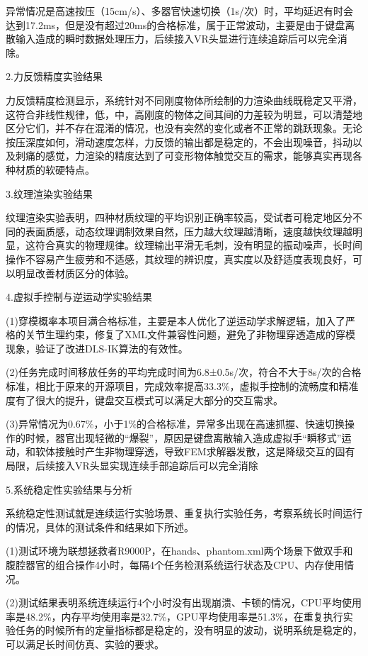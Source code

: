 异常情况是高速按压（15cm/s）、多器官快速切换（1s/次）时，平均延迟有时会达到17.2ms，但是没有超过20ms的合格标准，属于正常波动，主要是由于键盘离散输入造成的瞬时数据处理压力，后续接入VR头显进行连续追踪后可以完全消除。

2.力反馈精度实验结果

力反馈精度检测显示，系统针对不同刚度物体所绘制的力渲染曲线既稳定又平滑，这符合非线性规律，低，中，高刚度的物体之间其间的力差较为明显，可以清楚地区分它们，并不存在混淆的情况，也没有突然的变化或者不正常的跳跃现象。无论按压深度如何，滑动速度怎样，力反馈的输出都是稳定的，不会出现噪音，抖动以及刺痛的感觉，力渲染的精度达到了可变形物体触觉交互的需求，能够真实再现各种材质的软硬特点。

3.纹理渲染实验结果

纹理渲染实验表明，四种材质纹理的平均识别正确率较高，受试者可稳定地区分不同的表面质感，动态纹理调制效果自然，压力越大纹理越清晰，速度越快纹理越明显，这符合真实的物理规律。纹理输出平滑无毛刺，没有明显的振动噪声，长时间操作不容易产生疲劳和不适感，其纹理的辨识度，真实度以及舒适度表现良好，可以明显改善材质区分的体验。

4.虚拟手控制与逆运动学实验结果\label{_Toc23492}{}

(1)穿模概率本项目满合格标准，主要是本人优化了逆运动学求解逻辑，加入了严格的关节生理约束，修复了XML文件兼容性问题，避免了非物理穿透造成的穿模现象，验证了改进DLS-IK算法的有效性。

(2)任务完成时间移放任务的平均完成时间为6.8±0.5s/次，符合不大于8s/次的合格标准，相比于原来的开源项目，完成效率提高33.3\%，虚拟手控制的流畅度和精准度有了很大的提升，键盘交互模式可以满足大部分的交互需求。

(3)异常情况为0.67\%，小于1\%的合格标准，异常多出现在高速抓握、快速切换操作的时候，器官出现轻微的``爆裂''，原因是键盘离散输入造成虚拟手``瞬移式''运动，和软体接触时产生非物理穿透，导致FEM求解器发散，这是降级交互的固有局限，后续接入VR头显实现连续手部追踪后可以完全消除

5.系统稳定性实验结果与分析

系统稳定性测试就是连续运行实验场景、重复执行实验任务，考察系统长时间运行的情况，具体的测试条件和结果如下所述。

(1)测试环境为联想拯救者R9000P，在hands、phantom.xml两个场景下做双手和腹腔器官的组合操作4小时，每隔4个任务检测系统运行状态及CPU、内存使用情况。

(2)测试结果表明系统连续运行4个小时没有出现崩溃、卡顿的情况，CPU平均使用率是48.2\%，内存平均使用率是32.7\%，GPU平均使用率是51.3\%，在重复执行实验任务的时候所有的定量指标都是稳定的，没有明显的波动，说明系统是稳定的，可以满足长时间仿真、实验的要求。

